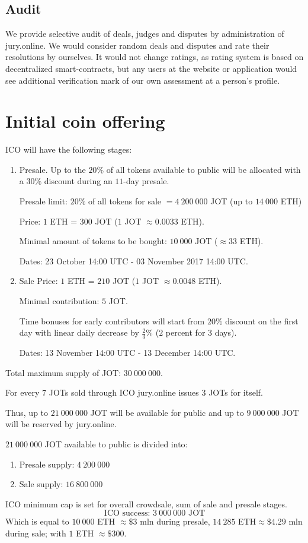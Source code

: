 \documentclass[12pt]{article}
\begin{document}
\subsection{Audit}
We provide selective audit of deals, judges and disputes by administration of jury.online. We would consider random deals and disputes and
rate their resolutions by ourselves. It would not change ratings, as rating system is based on decentralized smart-contracts, but any users
at the website or application would see additional verification mark of our own assessment at a person’s profile. 

\section{Initial coin offering}
ICO will have the following stages:

\begin{enumerate}
		\item Presale. 
				Up to the $20\%$ of all tokens available to public will be allocated with a $30\%$ discount during an $11$-day presale.

				Presale limit: $20\%$ of all tokens for sale $=4\ 200\ 000$ JOT (up to $14\ 000$ ETH)

				Price: $1$ ETH = $300$ JOT ($1$ JOT $\approx 0.0033$ ETH).

				Minimal amount of tokens to be bought: $10\ 000$ JOT ($\approx 33$ ETH).

				Dates: 23 October 14:00 UTC -  03 November 2017 14:00 UTC.

		\item Sale
				Price: $1$ ETH = $210$ JOT ($1$ JOT $\approx 0.0048$ ETH).

				Minimal contribution: $5$ JOT. 

				Time bonuses for early contributors will start from $20\%$ discount on the first day with linear daily decrease by $\frac{2}{3}$\% ($2$ percent for $3$ days).

				Dates: 13 November 14:00 UTC - 13 December 14:00 UTC.
\end{enumerate}

Total maximum supply of JOT: $30\ 000\ 000$.

For every $7$ JOTs sold through ICO jury.online issues $3$ JOTs for itself. 

Thus, up to $21\ 000\ 000$ JOT will be available for public and up to $9\ 000\ 000$ JOT will be reserved by jury.online.

$21\ 000\ 000$ JOT available to public is divided into:
\begin{enumerate}
		\item Presale supply: $4\ 200\ 000$
		\item Sale supply: $16\ 800\ 000$
\end{enumerate}
ICO minimum cap is set for overall crowdsale, sum of sale and presale stages.  \[\text{ICO success: }3\ 000\ 000 \text{ JOT}\] 
Which is equal to $10\ 000$ ETH $\approx \$3$ mln during presale, $14\ 285$ ETH$\approx
\$4.29$ mln during sale; with $1$ ETH $\approx \$300$.
\end{document}
